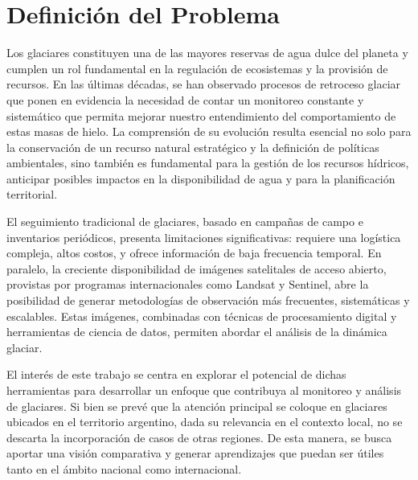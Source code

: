 \documentclass{article}
\begin{document}
\section{Definición del Problema}

Los glaciares constituyen una de las mayores reservas de agua dulce del planeta y cumplen un rol fundamental en la regulación de ecosistemas y la provisión de recursos. En las últimas décadas, se han observado procesos de retroceso glaciar que ponen en evidencia la necesidad de contar un monitoreo constante y sistemático que permita mejorar nuestro entendimiento del comportamiento de estas masas de hielo. La comprensión de su evolución resulta esencial no solo para la conservación de un recurso natural estratégico y la definición de políticas ambientales, sino también es fundamental para la gestión de los recursos hídricos, anticipar posibles impactos en la disponibilidad de agua y para la planificación territorial.

El seguimiento tradicional de glaciares, basado en campañas de campo e inventarios periódicos, presenta limitaciones significativas: requiere una logística compleja, altos costos, y ofrece información de baja frecuencia temporal. En paralelo, la creciente disponibilidad de imágenes satelitales de acceso abierto, provistas por programas internacionales como Landsat y Sentinel, abre la posibilidad de generar metodologías de observación más frecuentes, sistemáticas y escalables. Estas imágenes, combinadas con técnicas de procesamiento digital y herramientas de ciencia de datos, permiten abordar el análisis de la dinámica glaciar.

El interés de este trabajo se centra en explorar el potencial de dichas herramientas para desarrollar un enfoque que contribuya al monitoreo y análisis de glaciares. Si bien se prevé que la atención principal se coloque en glaciares ubicados en el territorio argentino, dada su relevancia en el contexto local, no se descarta la incorporación de casos de otras regiones. De esta manera, se busca aportar una visión comparativa y generar aprendizajes que puedan ser útiles tanto en el ámbito nacional como internacional.
\end{document}

